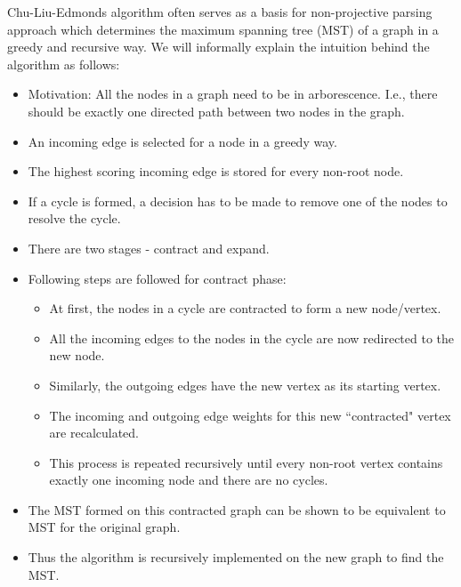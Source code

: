 Chu-Liu-Edmonds algorithm\cite{chu1965shortest,edmonds1967optimum} often serves as a basis for non-projective parsing approach which determines the maximum spanning tree (MST) of a graph in a greedy and recursive way. We will informally explain the intuition behind the algorithm as follows:
\begin{itemize}[label={--}]
\item{Motivation: } All the nodes in a graph need to be in arborescence. I.e., there should be exactly one directed path between two nodes in the graph.
\item An incoming edge is selected for a node in a greedy way.
\item The highest scoring incoming edge is stored for every non-root node.
\item If a cycle is formed, a decision has to be made to remove one of the nodes to resolve the cycle. 
\item There are two stages - contract and expand. 
\item Following steps are followed for contract phase:
\begin{itemize}[label=$\diamond$]
\item At first, the nodes in a cycle are contracted to form a new node/vertex.
\item All the incoming edges to the nodes in the cycle are now redirected to the new node.
\item Similarly, the outgoing edges have the new vertex as its starting vertex.
\item  The incoming and outgoing edge weights for this new ``contracted" vertex are recalculated.
\item This process is repeated recursively until every non-root vertex contains exactly one incoming node and there are no cycles.  
\end{itemize}
\item The MST formed on this contracted graph can be shown to be equivalent to MST for the original graph. \cite{georgiadis2003arborescence}
\item Thus the algorithm is recursively implemented on the new graph to find the MST.
\end{itemize}


